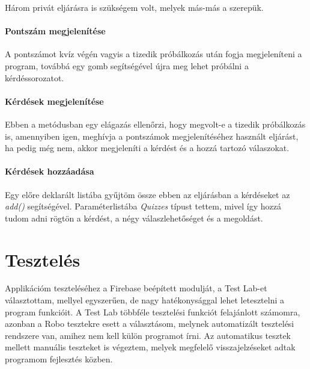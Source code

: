 \documentclass{thesis-ekf}
\begin{document}
\renewcommand{\lstlistingname}{kód}


Három privát eljárásra is szükségem volt, melyek más-más a szerepük.
\subsubsection{Pontszám megjelenítése}
A pontszámot kvíz végén vagyis a tizedik próbálkozás után fogja megjeleníteni a program, továbbá egy gomb segítségével újra meg lehet próbálni a kérdéssorozatot.

\subsubsection{Kérdések megjelenítése}
Ebben a metódusban egy elágazás ellenőrzi, hogy megvolt-e a tizedik próbálkozás is, amennyiben igen, meghívja a pontszámok megjelenítéséhez használt eljárást, ha pedig még nem, akkor megjeleníti a kérdést és a hozzá tartozó válaszokat.

\subsubsection{Kérdések hozzáadása}
Egy előre deklarált listába gyűjtöm össze ebben az eljárásban a kérdéseket az \textit{add()} segítségével. Paraméterlistába \textit{Quizzes} típust tettem, mivel így hozzá tudom adni rögtön a kérdést, a négy válaszlehetőséget és a megoldást.

\chapter{Tesztelés}
Applikációm teszteléséhez a Firebase beépített modulját, a Test Lab-et választottam, mellyel egyszerűen, de nagy hatékonysággal lehet letesztelni a program funkcióit. A Test Lab többféle tesztelési funkciót felajánlott számomra, azonban a Robo tesztekre esett a választásom, melynek automatizált tesztelési rendszere van, amihez nem kell külön programot írni. Az automatikus tesztek mellett manuális teszteket is végeztem, melyek megfelelő visszajelzéseket adtak programom fejlesztés közben.
\end{document}
